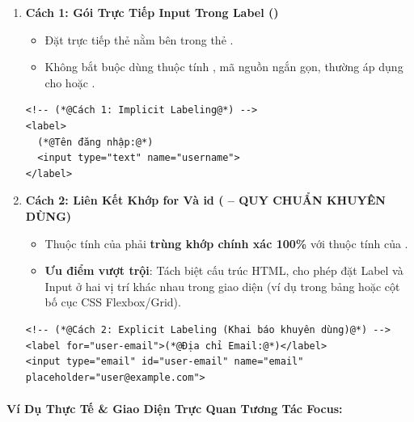 \begin{enumerate}[leftmargin=1.5em, itemsep=8pt, parsep=0pt]
    \item \textbf{Cách 1: Gói Trực Tiếp Input Trong Label ()}
    \begin{itemize}[leftmargin=1.2em, itemsep=3pt]
        \item Đặt trực tiếp thẻ  nằm bên trong thẻ .
        \item Không bắt buộc dùng thuộc tính , mã nguồn ngắn gọn, thường áp dụng cho  hoặc .
    \end{itemize}
    \begin{codeWindow}
\begin{lstlisting}[language=HTML5]
<!-- (*@Cách 1: Implicit Labeling@*) -->
<label>
  (*@Tên đăng nhập:@*)
  <input type="text" name="username">
</label>
\end{lstlisting}
    \end{codeWindow}

    \item \textbf{Cách 2: Liên Kết Khớp for Và id ( -- \textcolor{accentOrange}{\textbf{QUY CHUẨN KHUYÊN DÙNG}})}
    \begin{itemize}[leftmargin=1.2em, itemsep=3pt]
        \item Thuộc tính  của  phải \textbf{trùng khớp chính xác 100\%} với thuộc tính  của .
        \item \textbf{Ưu điểm vượt trội}: Tách biệt cấu trúc HTML, cho phép đặt Label và Input ở hai vị trí khác nhau trong giao diện (ví dụ trong bảng hoặc cột bố cục CSS Flexbox/Grid).
    \end{itemize}
    \begin{codeWindow}
\begin{lstlisting}[language=HTML5]
<!-- (*@Cách 2: Explicit Labeling (Khai báo khuyên dùng)@*) -->
<label for="user-email">(*@Địa chỉ Email:@*)</label>
<input type="email" id="user-email" name="email" placeholder="user@example.com">
\end{lstlisting}
    \end{codeWindow}
\end{enumerate}

\paragraph{Ví Dụ Thực Tế \& Giao Diện Trực Quan Tương Tác Focus:}

